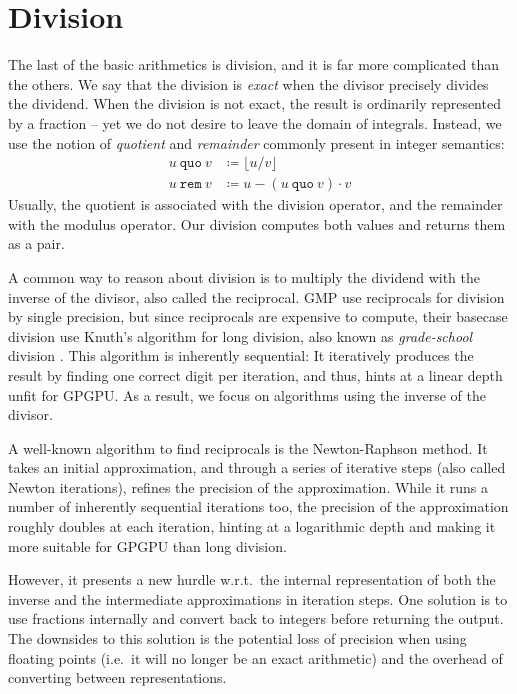 \section{Division}
\label{sec:div}

The last of the basic arithmetics is division, and it is far more complicated
than the others. We say that the division is \textit{exact} when the divisor
precisely divides the dividend. When the division is not exact, the result is
ordinarily represented by a fraction -- yet we do not desire to leave the domain
of integrals. Instead, we use the notion of \textit{quotient} and
\textit{remainder} commonly present in integer semantics:
\begin{align}
  u~\mathtt{quo}~v &\coloneq \lfloor u/v \rfloor\\
  u~ \mathtt{rem}~v &\coloneq u - \left( u~\mathtt{quo}~v \right)\cdot v
\end{align}
Usually, the quotient is associated with the division operator, and the
remainder with the modulus operator. Our division computes both values and
returns them as a pair.

A common way to reason about division is to multiply the dividend with the
inverse of the divisor, also called the reciprocal. GMP use reciprocals for
division by single precision, but since reciprocals are expensive to compute,
their basecase division use Knuth's algorithm for long division, also known as
\textit{grade-school} division \cite{GMP, knuth97}. This algorithm is inherently
sequential: It iteratively produces the result by finding one correct digit per
iteration, and thus, hints at a linear depth unfit for GPGPU. As a result, we
focus on algorithms using the inverse of the divisor.

A well-known algorithm to find reciprocals is the Newton-Raphson method. It
takes an initial approximation, and through a series of iterative steps (also
called Newton iterations), refines the precision of the approximation. While it
runs a number of inherently sequential iterations too, the precision of the
approximation roughly doubles at each iteration, hinting at a logarithmic depth
and making it more suitable for GPGPU than long division.

However, it presents a new hurdle w.r.t.\ the internal representation of both
the inverse and the intermediate approximations in iteration steps. One solution
is to use fractions internally and convert back to integers before returning the
output. The downsides to this solution is the potential loss of precision when
using floating points (i.e.\ it will no longer be an exact arithmetic) and the
overhead of converting between representations.

